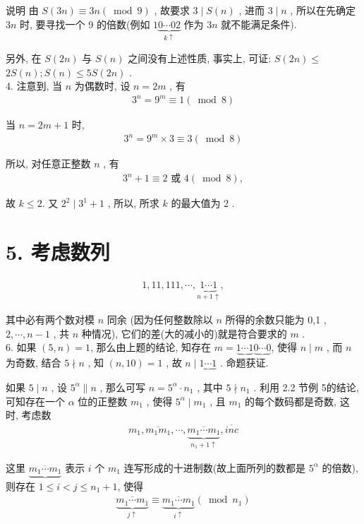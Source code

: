 说明 由 $S(3 n) \equiv 3 n(\bmod 9)$ , 故要求 $3 \mid S(n)$ , 进而 $3 \mid n$ , 所以在先确定 $3 n$ 时, 要寻找一个 9 的倍数(例如 $1 \underbrace{0 \cdots 02}_{k \uparrow}$ 作为 $3 n$ 就不能满足条件).

另外, 在 $S(2 n)$ 与 $S(n)$ 之间没有上述性质, 事实上, 可证:  $S(2 n) \leqslant$ $2 S(n) ;  S(n) \leqslant 5 S(2 n)$ . \\
4. 注意到, 当 $n$ 为偶数时, 设 $n=2 m$ , 有
\begin{align*}
	3^{n}=9^{m} \equiv 1(\bmod 8)
\end{align*}

当 $n=2 m+1$ 时, 
\begin{align*}
	3^{n}=9^{m} \times 3 \equiv 3(\bmod 8)
\end{align*}

所以, 对任意正整数 $n$ , 有
\begin{align*}
	3^{n}+1 \equiv 2 \text { 或 } 4(\bmod 8),
\end{align*}

故 $k \leqslant 2$. 又 $2^{2} \mid 3^{1}+1$ , 所以, 所求 $k$ 的最大值为 2 .

\section{5. 考虑数列}

\begin{align*}
	1,11,111, \cdots, \underbrace{1 \cdots 1}_{n+1 \uparrow},
\end{align*}

其中必有两个数对模 $n$ 同余 (因为任何整数除以 $n$ 所得的余数只能为 0,1 , $2 ,  \cdots ,  n-1$ , 共 $n$ 种情况), 它们的差(大的减小的)就是符合要求的 $m$ . \\
6. 如果 $(5, n)=1$, 那么由上题的结论, 知存在 $m=\underbrace{1 \cdots 1} \underbrace{0 \cdots 0}$, 使得 $n \mid m$ , 而 $n$ 为奇数, 结合 $5 \nmid n$ , 知 $(n, 10)=1$ , 故 $n \mid \underbrace{1 \cdots 1}$ . 命题获证.

如果 $5 \mid n$ , 设 $5^{\alpha} \| n$ , 那么可写 $n=5^{\alpha} \cdot n_{1}$ , 其中 $5 \nmid n_{1}$ . 利用 2.2 节例 5的结论, 可知存在一个 $\alpha$ 位的正整数 $m_{1}$ , 使得 $5^{\alpha} \mid m_{1}$ , 且 $m_{1}$ 的每个数码都是奇数, 这时, 考虑数
\begin{align*}
	m_{1}, \overline{m_{1} m_{1}}, \cdots, \overline{\underbrace{m_{1} \cdots m_{1}}_{n_{1}+1 \uparrow}}, \overline{i n c}
\end{align*}

这里 $\underbrace{\overline{m_{1} \cdots m_{1}}}$ 表示 $i$ 个 $m_{1}$ 连写形成的十进制数(故上面所列的数都是 $5^{\alpha}$ 的倍数), 则存在 $1 \leqslant i<j \leqslant n_{1}+1$, 使得
\begin{align*}
	\underbrace{\overline{m_{1} \cdots m_{1}}}_{j \uparrow} \equiv \underbrace{\overline{m_{1} \cdots m_{1}}}_{i \uparrow}\left(\bmod n_{1}\right)
\end{align*}

